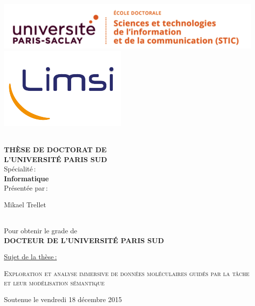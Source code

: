 \begin{titlepage}

\includegraphics[height=2.cm]{./figures/logo_paris_saclay_stic}\hfill
\includegraphics[height=2.cm]{./figures/limsilogo_new_transparent_crop}\hfill
\\
\\



\begin{center}
 \textbf{THÈSE DE DOCTORAT DE\\ L'UNIVERSITÉ PARIS SUD\\}
Spécialité\,:\\
\textbf{Informatique}\\ 
Présentée par\,:\\ 
\begin{LARGE}
Mikael Trellet\end{LARGE}\\
Pour obtenir le grade de\\
\textbf{DOCTEUR DE L'UNIVERSITÉ PARIS SUD}
\end{center}

\noindent \underline{Sujet de la thèse\,:}\\
\begin{center}
\begin{Large}
{\textsc{Exploration et analyse immersive de données moléculaires guidés par la tâche et leur modélisation sémantique}}
\end{Large}
\end{center}

Soutenue le vendredi 18 décembre 2015\\


\end{titlepage}
